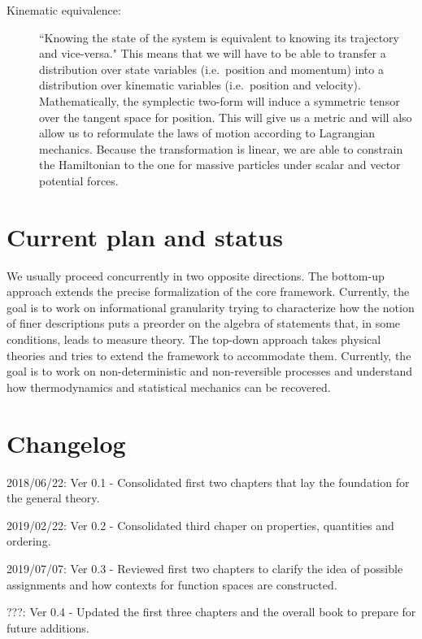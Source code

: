 \documentclass[11pt,letterpaper,fleqn]{memoir} %
\begin{document}
\begin{description}
	\item[Kinematic equivalence:] ``Knowing the state of the system is equivalent to knowing its trajectory and vice-versa." This means that we will have to be able to transfer a distribution over state variables (i.e.~position and momentum) into a distribution over kinematic variables (i.e.~position and velocity). Mathematically, the symplectic two-form will induce a symmetric tensor over the tangent space for position. This will give us a metric and will also allow us to reformulate the laws of motion according to Lagrangian mechanics. Because the transformation is linear, we are able to constrain the Hamiltonian to the one for massive particles under scalar and vector potential forces.
\end{description}

\section*{Current plan and status}

We usually proceed concurrently in two opposite directions. The bottom-up approach extends the precise formalization of the core framework. Currently, the goal is to work on informational granularity trying to characterize how the notion of finer descriptions puts a preorder on the algebra of statements that, in some conditions, leads to measure theory. The top-down approach takes physical theories and tries to extend the framework to accommodate them. Currently, the goal is to work on non-deterministic and non-reversible processes and understand how thermodynamics and statistical mechanics can be recovered.

\section*{Changelog}

\begin{description}
	\item 2018/06/22: Ver 0.1 - Consolidated first two chapters that lay the foundation for the general theory.
	\item 2019/02/22: Ver 0.2 - Consolidated third chaper on properties, quantities and ordering.
	\item 2019/07/07: Ver 0.3 - Reviewed first two chapters to clarify the idea of possible assignments and how contexts for function spaces are constructed.
	\item ???: Ver 0.4 - Updated the first three chapters and the overall book to prepare for future additions.
\end{description}
\end{document}
